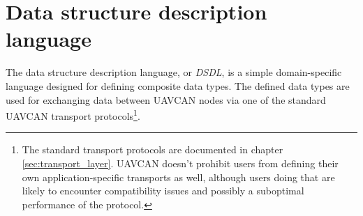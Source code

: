 \chapter{Data structure description language}\label{sec:dsdl}

The data structure description language, or \emph{DSDL}, is a simple domain-specific language designed for
defining composite data types.
The defined data types are used for exchanging data between UAVCAN nodes via one of the standard UAVCAN
transport protocols\footnote{The standard transport protocols are documented in chapter \ref{sec:transport_layer}.
UAVCAN doesn't prohibit users from defining their own application-specific transports as well,
although users doing that are likely to encounter compatibility issues and possibly a suboptimal
performance of the protocol.}.










